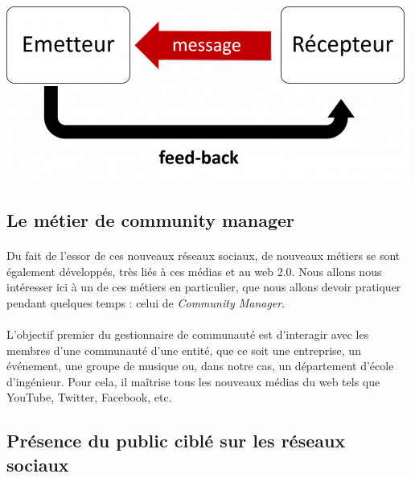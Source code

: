 \begin{center}
\includegraphics[scale=0.5]{./image/communication_digitale.png}
\end{center}

\subsection{Le métier de community manager}

\paragraph{}
Du fait de l'essor de ces nouveaux réseaux sociaux, de nouveaux métiers se sont également développés, 
très liés à ces médias et au web 2.0. Nous allons nous intéresser ici à un de ces métiers en particulier, 
que nous allons devoir pratiquer pendant quelques temps : celui de \emph{Community Manager}.

\paragraph{}
L'objectif premier du gestionnaire de communauté est d'interagir avec les membres d'une communauté d'une 
entité, que ce soit une entreprise, un événement, une groupe de musique ou, dans notre cas, un département 
d'école d'ingénieur. Pour cela, il maîtrise tous les nouveaux médias du web tels que YouTube, Twitter, 
Facebook, etc. 

\subsection{Présence du public ciblé sur les réseaux sociaux}
